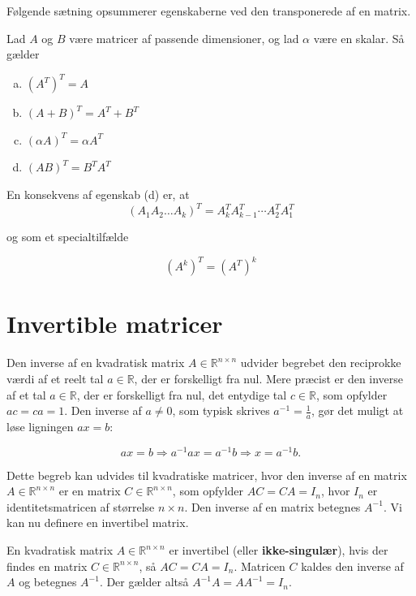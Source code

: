 Følgende sætning opsummerer egenskaberne ved den transponerede af en matrix.

\begin{theorem}
    Lad $A$ og $B$ være matricer af passende dimensioner, og lad $\alpha$ være en skalar. Så gælder
    \begin{enumerate}[(a)]
        \item $(A^T)^T = A$
        \item $(A + B)^T = A^T + B^T$
        \item $(\alpha A)^T = \alpha A^T$
        \item $(AB)^T = B^T A^T$
    \end{enumerate}
\end{theorem}

En konsekvens af egenskab (d) er, at
\[
\left(A_1 A_2 \ldots A_k\right)^T=A_k^T A_{k-1}^T \cdots A_2^T A_1^T
\]

og som et specialtilfælde

\[
\left(A^k\right)^T=\left(A^T\right)^k
\]

\section{Invertible matricer}
Den inverse af en kvadratisk matrix \( A \in \mathbb{R}^{n \times n} \) udvider begrebet den reciprokke værdi af et reelt tal \( a \in \mathbb{R} \), der er forskelligt fra nul. Mere præcist er den inverse af et tal \( a \in \mathbb{R} \), der er forskelligt fra nul, det entydige tal \( c \in \mathbb{R} \), som opfylder \( a c = c a = 1 \). Den inverse af \( a \neq 0 \), som typisk skrives \( a^{-1} = \frac{1}{a} \), gør det muligt at løse ligningen \( a x = b \):

\[
a x = b \Rightarrow a^{-1} a x = a^{-1} b \Rightarrow x = a^{-1} b.
\]

Dette begreb kan udvides til kvadratiske matricer, hvor den inverse af en matrix \( A \in \mathbb{R}^{n \times n} \) er en matrix \( C \in \mathbb{R}^{n \times n} \), som opfylder \( A C = C A = I_n \), hvor \( I_n \) er identitetsmatricen af størrelse \( n \times n \). Den inverse af en matrix betegnes \( A^{-1} \). Vi kan nu definere en invertibel matrix.

\begin{definition}
    En kvadratisk matrix \( A \in \mathbb{R}^{n \times n} \) er invertibel (eller \textbf{ikke-singulær}), hvis der findes en matrix \( C \in \mathbb{R}^{n \times n} \), så \( A C = C A = I_n \). Matricen \( C \) kaldes den inverse af \( A \) og betegnes \( A^{-1} \). Der gælder altså \( A^{-1} A = A A^{-1} = I_n \).
\end{definition}

